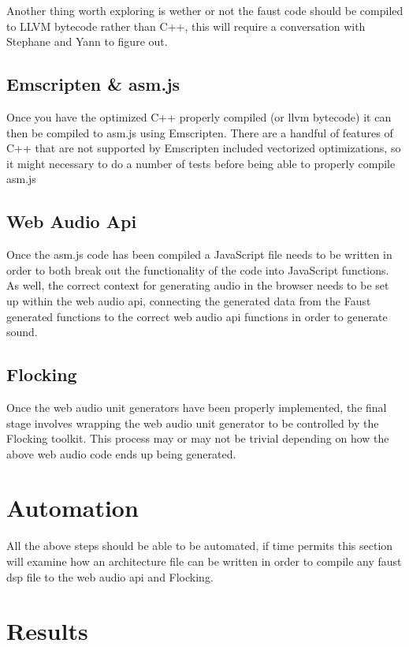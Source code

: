 \documentclass[runningheads,a4paper]{llncs}
\begin{document}
Another thing worth exploring is wether or not the faust code should be compiled to LLVM bytecode rather than C++, this will require a conversation with Stephane and Yann to figure out.

\subsection{Emscripten \& asm.js}

Once you have the optimized C++ properly compiled (or llvm bytecode) it can then be compiled to asm.js using Emscripten.  There are a handful of features of C++ that are not supported by Emscripten included vectorized optimizations, so it might necessary to do a number of tests before being able to properly compile asm.js

\subsection{Web Audio Api}

Once the asm.js code has been compiled a JavaScript file needs to be written in order to both break out the functionality of the code into JavaScript functions.  As well, the correct context for generating audio in the browser needs to be set up within the web audio api, connecting the generated data from the Faust generated functions to the correct web audio api functions in order to generate sound.

\subsection{Flocking}

Once the web audio unit generators have been properly implemented, the final stage involves wrapping the web audio unit generator to be controlled by the Flocking toolkit.  This process may or may not be trivial depending on how the above web audio code ends up being generated.

\section{Automation}

All the above steps should be able to be automated, if time permits this section will examine how an architecture file can be written in order to compile any faust dsp file to the web audio api and Flocking.

\section{Results}
\end{document}

